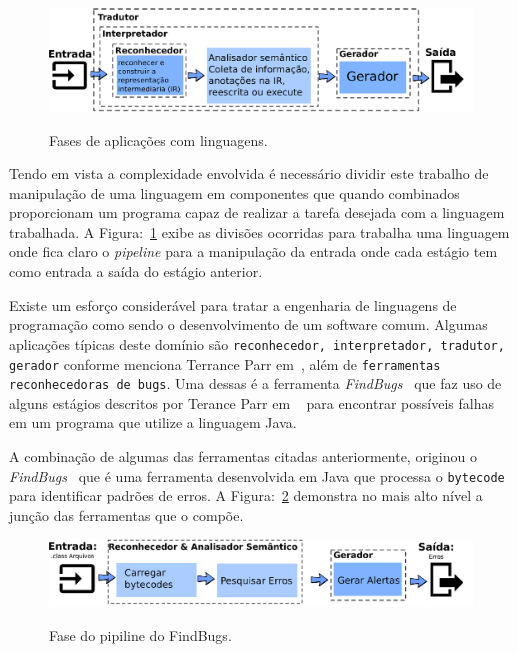 \begin{figure}[h]
	\center
	\includegraphics[scale=0.9]{Imagens/stagesLanguageApp}
	\label{fig:stagesLanguageApp}
	\caption{Fases de aplicaç\~{o}es com linguagens.}
\end{figure}

Tendo em vista a complexidade envolvida \'{e} necess\'{a}rio dividir este trabalho de manipulaç\~{a}o de uma linguagem em componentes que quando combinados proporcionam um programa capaz de realizar a tarefa desejada com a linguagem trabalhada. A Figura:~\ref{fig:stagesLanguageApp} exibe as divis\~{o}es ocorridas para trabalha uma linguagem onde fica claro o \textit{pipeline} para a manipulaç\~{a}o da entrada onde cada est\'{a}gio tem como entrada a sa\'{i}da do est\'{a}gio anterior.

Existe um esforço consider\'{a}vel para tratar a engenharia de linguagens de programaç\~{a}o como sendo o desenvolvimento de um software comum. Algumas aplicaç\~{o}es t\'{i}picas deste dom\'{i}nio s\~{a}o \texttt{reconhecedor, interpretador, tradutor, gerador} conforme menciona Terrance Parr em~\cite{Parr:2009:LIP:1823613},  al\'{e}m de \texttt{ferramentas reconhecedoras de bugs}. Uma dessas \'{e} a ferramenta \textit{FindBugs}~\cite{FindBugs} que faz uso de alguns est\'{a}gios descritos por Terance Parr em ~\cite{Parr:2009:LIP:1823613} para encontrar poss\'{i}veis falhas em um programa que utilize a linguagem Java.

A combinaç\~{a}o de algumas das ferramentas citadas anteriormente, originou o \textit{FindBugs}~\cite{FindBugs} que \'{e} uma ferramenta desenvolvida em Java que processa o \texttt{bytecode} para identificar padr\~{o}es de erros. A Figura:~\ref{fig:findBugs} demonstra no mais alto n\'{i}vel a junç\~{a}o das ferramentas que o comp\~{o}e. 

\begin{figure}[h]
	\center
	\includegraphics[scale=0.9]{Imagens/pipelineFindbugs}
	\label{fig:findBugs}
	\caption{Fase do pipiline do FindBugs.}
\end{figure}

